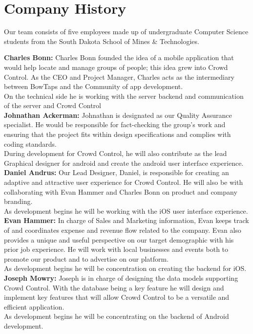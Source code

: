 \section{Company History}

Our team consists of five employees made up of undergraduate Computer Science students from the South Dakota School of Mines \& Technologies. 

\textbf{Charles Bonn:} Charles Bonn founded the idea of a mobile application that would help locate and manage groups of people; this idea grew into Crowd Control. As the CEO and Project Manager, Charles acts as the intermediary between BowTaps and the Community of app development. \\
On the technical side he is working with the server backend and communication of the server and Crowd Control \\

\textbf{Johnathan Ackerman:} Johnathan is designated as our Quality Assurance specialist. He would be responsible for fact-checking the group’s work and ensuring that the project fits within design specifications and complies with coding standards.\\
 During development for Crowd Control, he will also contribute as the lead Graphical designer for android and create the android user interface experience.\\

\textbf{Daniel Andrus:} Our Lead Designer, Daniel, is responsible for creating an adaptive and attractive user experience for Crowd Control. He will also be with collaborating with Evan Hammer and Charles Bonn on product and company branding.\\
 As development begins he will be working with the iOS user interface experience.\\

\textbf{Evan Hammer:} In charge of Sales and Marketing information, Evan keeps track of and coordinates expense and revenue flow related to the company. Evan also provides a unique and useful perspective on our target demographic with his prior job experience. He will work with local businesses and events both to promote our product and to advertise on our platform.\\
 As development begins he will be concentration on creating the backend for iOS. \\

\textbf{Joseph Mowry:} Joseph is in charge of designing the data models supporting Crowd Control. With the database being a key feature he will design and implement key features that will allow Crowd Control to be a versatile and efficient application.\\
 As development begins he will be concentrating on the backend of Android development.\\






